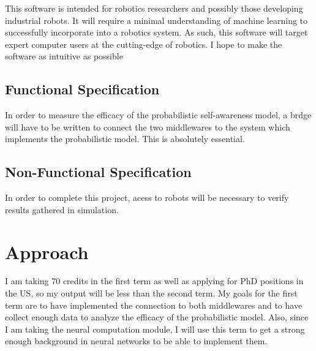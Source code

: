 \documentclass[10pt, a4paper]{article}
\begin{document}
This software is intended for robotics researchers and possibly those
developing industrial robots. It will require a minimal understanding
of machine learning to successfully incorporate into a robotics
system. As such, this software will target expert computer users at
the cutting-edge of robotics. I hope to make the software as intuitive
as possible

\subsection*{Functional Specification}

In order to measure the efficacy of the probabilistic self-awareness
model, a brdge will have to be written to connect the two middlewares
to the system which implements the probabilistic model. This is
absolutely essential.


\subsection*{Non-Functional Specification}

In order to complete this project, acess to robots will be necessary
to verify results gathered in simulation.

\section*{Approach}


I am taking 70 credits in the first term as well as applying for PhD
positions in the US, so my output will be less than the second
term. My goals for the first term are to have implemented the
connection to both middlewares and to have collect enough data to
analyze the efficacy of the probabilistic model. Also, since I am
taking the neural computation module, I will use this term to get a
strong enough background in neural networks to be able to implement
them.
\end{document}
